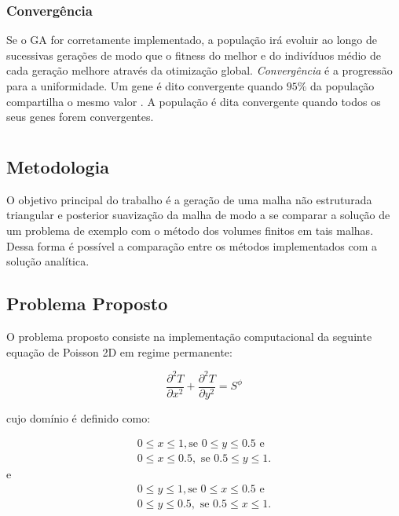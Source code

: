 \subsection{Convergência}
Se o GA for corretamente implementado, a população irá evoluir ao longo de sucessivas gerações de modo que o fitness do melhor e do indivíduos médio de cada geração melhore através da otimização global. \textit{Convergência} é a progressão para a uniformidade. Um gene é dito convergente quando $95\%$ da população compartilha o mesmo valor \cite{DeJong1975}. A população é dita convergente quando todos os seus genes forem convergentes.

\chapter[DESENVOLVIMENTO]{}

\section{Metodologia}
O objetivo principal do trabalho é a geração de uma malha não estruturada triangular e posterior suavização da malha de modo a se comparar a solução de um problema de exemplo com o método dos volumes finitos em tais malhas. Dessa forma é possível a comparação entre os métodos implementados com a solução analítica.

\section{Problema Proposto}

O problema proposto consiste na implementação computacional da seguinte equação de Poisson 2D em regime permanente:

\begin{equation*}
    \frac{\partial^2 T}{\partial x^2} + \frac{\partial^2 T}{\partial y^2} = S^\phi
\end{equation*}

cujo domínio é definido como:

\begin{equation*}
\begin{split}
    0\leq x \leq 1, \text{se } 0 \leq y \leq 0.5 \text{ e}\\
    0 \leq x \leq 0.5, \text{ se } 0.5 \leq y \leq 1.
\end{split}
\end{equation*}
e
\begin{equation*}
\begin{split}
    0\leq y \leq 1, \text{se } 0 \leq x \leq 0.5 \text{ e}\\
    0 \leq y \leq 0.5, \text{ se } 0.5 \leq x \leq 1.
\end{split}
\end{equation*}

